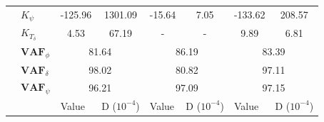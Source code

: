 \begin{table}[]
\begin{tabular}{llcccccc}
                                    & $K_\psi $             & -125.96                                    & 1301.09                                            & -15.64                                     & 7.05                                               & -133.62                                    & 208.57                                             \\
                                    & $K_{T_\delta}$        & 4.53                                       & 67.19                                              & -                                          & -                                                  & 9.89                                       & 6.81                                               \\ \cline{2-8} 
                                    & $\mathbf{VAF}_\phi$   & \multicolumn{2}{c}{81.64}                                                                       & \multicolumn{2}{c}{86.19}                                                                       & \multicolumn{2}{c}{83.39}                                                                       \\
                                    & $\mathbf{VAF}_\delta$ & \multicolumn{2}{c}{98.02}                                                                       & \multicolumn{2}{c}{80.82}                                                                       & \multicolumn{2}{c}{97.11}                                                                       \\
                                    & $\mathbf{VAF}_\psi$   & \multicolumn{2}{c}{96.21}                                                                       & \multicolumn{2}{c}{97.09}                                                                       & \multicolumn{2}{c}{97.15}                                                                       \\ \hline
                                    &                       & \multicolumn{1}{l}{\multirow{2}{*}{Value}} & \multicolumn{1}{l}{\multirow{2}{*}{D ($10^{-4}$)}} & \multicolumn{1}{l}{\multirow{2}{*}{Value}} & \multicolumn{1}{l}{\multirow{2}{*}{D ($10^{-4}$)}} & \multicolumn{1}{l}{\multirow{2}{*}{Value}} & \multicolumn{1}{l}{\multirow{2}{*}{D ($10^{-4}$)}} \\
                                    &                       & \multicolumn{1}{l}{}                       & \multicolumn{1}{l}{}                               & \multicolumn{1}{l}{}                       & \multicolumn{1}{l}{}                               & \multicolumn{1}{l}{}                       & \multicolumn{1}{l}{}                               \\ \cline{3-8} 

\end{tabular}
\end{table}
